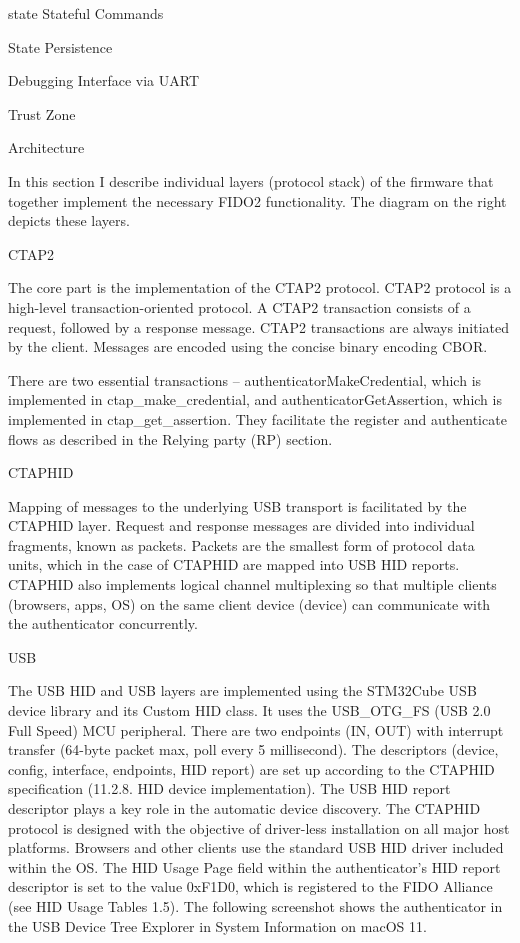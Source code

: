 state
\secc Stateful Commands


\sec State Persistence


\sec Debugging Interface via UART




\sec Trust Zone







\sec Architecture

In this section I describe individual layers (protocol stack) of the firmware that together implement the necessary FIDO2 functionality. The diagram on the right depicts these layers.


\secc CTAP2

The core part is the implementation of the CTAP2 protocol. CTAP2 protocol is a high-level transaction-oriented protocol. A CTAP2 transaction consists of a request, followed by a response message. CTAP2 transactions are always initiated by the client. Messages are encoded using the concise binary encoding CBOR.

There are two essential transactions – authenticatorMakeCredential, which is implemented in ctap_make_credential, and authenticatorGetAssertion, which is implemented in ctap_get_assertion. They facilitate the register and authenticate flows as described in the Relying party (RP) section.


\secc CTAPHID

Mapping of messages to the underlying USB transport is facilitated by the CTAPHID layer. Request and response messages are divided into individual fragments, known as packets. Packets are the smallest form of protocol data units, which in the case of CTAPHID are mapped into USB HID reports. CTAPHID also implements logical channel multiplexing so that multiple clients (browsers, apps, OS) on the same client device (device) can communicate with the authenticator concurrently.


\secc USB

The USB HID and USB layers are implemented using the STM32Cube USB device library and its Custom HID class. It uses the USB_OTG_FS (USB 2.0 Full Speed) MCU peripheral.
There are two endpoints (IN, OUT) with interrupt transfer (64-byte packet max, poll every 5 millisecond). The descriptors (device, config, interface, endpoints, HID report) are set up according to the CTAPHID specification (11.2.8. HID device implementation).
The USB HID report descriptor plays a key role in the automatic device discovery. The CTAPHID protocol is designed with the objective of driver-less installation on all major host platforms. Browsers and other clients use the standard USB HID driver included within the OS. The HID Usage Page field within the authenticator’s HID report descriptor is set to the value 0xF1D0, which is registered to the FIDO Alliance (see HID Usage Tables 1.5).
The following screenshot shows the authenticator in the USB Device Tree Explorer in System Information on macOS 11.

